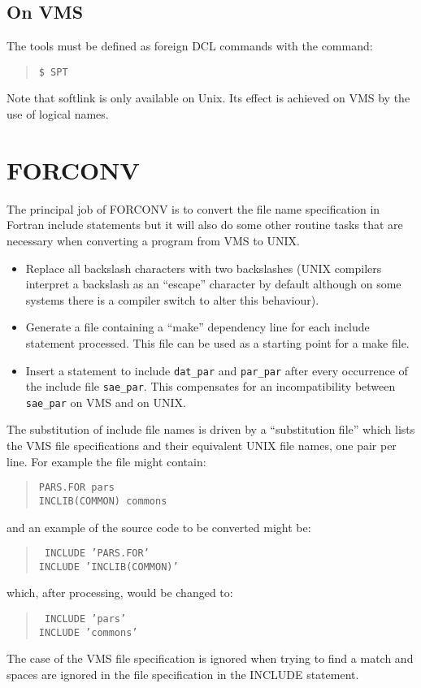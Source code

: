 \subsection{On VMS}
The tools must be defined as foreign DCL commands with the command:
\begin{quote}
{\tt \$ SPT}
\end{quote}
Note that softlink is only available on Unix. Its effect is achieved on VMS by
the use of logical names.

\section{FORCONV}

The principal job of FORCONV is to convert the file name specification
in Fortran include statements but it will also do some other routine tasks
that are necessary when converting a program from VMS to UNIX.
\begin{itemize}
\item Replace all backslash characters with two backslashes (UNIX
compilers interpret a backslash as an ``escape'' character by default
although on some systems there is a compiler switch to alter this
behaviour).

\item Generate a file containing a ``make'' dependency line for each 
include statement processed. This file can be used as a starting point for a
make file.

\item Insert a statement to include {\tt dat\_par} and {\tt par\_par} after
every occurrence of the include file {\tt sae\_par}. This compensates for an
incompatibility  between {\tt sae\_par} on VMS and on UNIX.

\end{itemize}

The substitution of include file names is driven by a ``substitution
file'' which lists the VMS file specifications and their equivalent UNIX
file names, one pair per line. For example the file might contain:
\begin{quote}
{\tt PARS.FOR pars\\
INCLIB(COMMON) commons}
\end{quote}
and an example of the source code to be converted might be:
\begin{quote}
{\tt
      INCLUDE 'PARS.FOR'\\
      INCLUDE 'INCLIB(COMMON)'}
\end{quote}
which, after processing, would be changed to:
\begin{quote}
{\tt 
      INCLUDE 'pars'\\
      INCLUDE 'commons'}
\end{quote}
The case of the VMS file specification is ignored when trying to find a
match and spaces are ignored in the file specification in the INCLUDE
statement.

